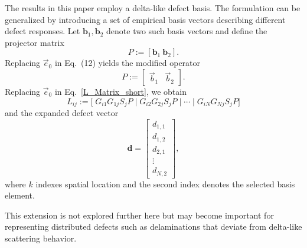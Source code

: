 \documentclass[a4paper,fleqn]{cas-sc}
\begin{document}
The results in this paper employ a delta-like defect basis. The formulation can be generalized by introducing a set of empirical basis vectors describing different defect responses. Let $\mathbf{b}_1, \mathbf{b}_2$ denote two such basis vectors and define the projector matrix
\[
P := [\mathbf{b}_1 \ \mathbf{b}_2].
\]
Replacing $\vec{e}_0$ in Eq.~(12) yields the modified operator
\begin{equation}
  P := \begin{bmatrix}
    \vec{b}_1 & \vec{b}_2
  \end{bmatrix}.
\end{equation}
Replacing $\vec{e}_0$ in Eq.~\ref{L_Matrix_short}, we obtain
\begin{equation}
L_{ij} := \big[\; G_{i1} G_{1j} S_j P \;\big|\; G_{i2} G_{2j} S_j  P \;\big|\; \cdots \;\big|\; G_{iN} G_{Nj} S_j  P \big]
\end{equation}
and the expanded defect vector
\[
\mathbf{d} =
\begin{bmatrix}
d_{1,1} \\
d_{1,2} \\
d_{2,1} \\
\vdots \\
d_{N,2}
\end{bmatrix},
\]
where $k$ indexes spatial location and the second index denotes the selected basis element.

This extension is not explored further here but may become important for representing distributed defects such as delaminations that deviate from delta-like scattering behavior.
\end{document}
